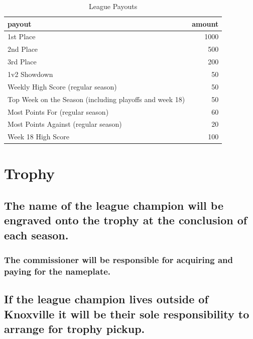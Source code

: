 \documentclass[
]{book}
\begin{document}
\begin{table}

\caption{\label{tab:unnamed-chunk-7}League Payouts}
\centering
\begin{tabular}[t]{lr}
\toprule
payout & amount\\
\midrule
1st Place & 1000\\
2nd Place & 500\\
3rd Place & 200\\
1v2 Showdown & 50\\
Weekly High Score (regular season) & 50\\
\addlinespace
Top Week on the Season (including playoffs and week 18) & 50\\
Most Points For (regular season) & 60\\
Most Points Against (regular season) & 20\\
Week 18 High Score & 100\\
\bottomrule
\end{tabular}
\end{table}

\hypertarget{trophy}{%
\section{Trophy}\label{trophy}}

\hypertarget{the-name-of-the-league-champion-will-be-engraved-onto-the-trophy-at-the-conclusion-of-each-season.}{%
\subsection{The name of the league champion will be engraved onto the trophy at the conclusion of each season.}\label{the-name-of-the-league-champion-will-be-engraved-onto-the-trophy-at-the-conclusion-of-each-season.}}

\hypertarget{the-commissioner-will-be-responsible-for-acquiring-and-paying-for-the-nameplate.}{%
\subsubsection{The commissioner will be responsible for acquiring and paying for the nameplate.}\label{the-commissioner-will-be-responsible-for-acquiring-and-paying-for-the-nameplate.}}

\hypertarget{if-the-league-champion-lives-outside-of-knoxville-it-will-be-their-sole-responsibility-to-arrange-for-trophy-pickup.}{%
\subsection{If the league champion lives outside of Knoxville it will be their sole responsibility to arrange for trophy pickup.}\label{if-the-league-champion-lives-outside-of-knoxville-it-will-be-their-sole-responsibility-to-arrange-for-trophy-pickup.}}
\end{document}
